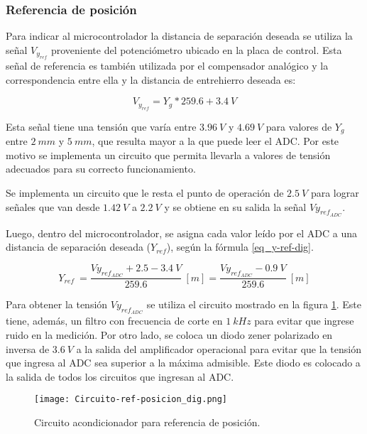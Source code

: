 \subsubsection{Referencia de posición}

 Para indicar al microcontrolador la distancia de separación deseada se utiliza la señal  $V_{y_{ref}}$ proveniente del potenciómetro ubicado en la placa de control. Esta señal de referencia es también utilizada por el compensador analógico y la correspondencia entre ella y la distancia de entrehierro deseada es:
 
 \begin{equation} \label{eq_vyref_vs_yg}
 	V_{y_{ref}}=Y_g*259.6+3.4\:V
 \end{equation}
 
Esta señal tiene una tensión que varía entre $3.96\:V$ y $4.69\:V$ para valores de $Y_g$ entre $2\:mm$ y $5\:mm$, que resulta mayor a la que puede leer el ADC. Por este motivo se implementa un circuito que permita llevarla a valores de tensión adecuados para su correcto funcionamiento. 

Se implementa un circuito que le resta el punto de operación de $2.5\:V$  para lograr señales que van desde $1.42\:V$ a $2.2\:V$ y se obtiene en su salida la señal $Vy_{ref_{ADC}}$.

Luego, dentro del microcontrolador, se asigna cada valor leído por el ADC a una distancia de separación deseada ($Y_{ref}$), según la fórmula \ref{eq_y-ref-dig}.

\begin{equation} \label{eq_y-ref-dig}
	Y_{ref}\ =\frac{Vy_{ref_{ADC}} +2.5 - 3.4\:V}{259.6}\:[m]=\frac{Vy_{ref_{ADC}} - 0.9\:V}{259.6}\:[m]
\end{equation}

Para obtener la tensión $Vy_{ref_{ADC}}$ se utiliza el circuito mostrado en la figura \ref{fig:circuito-ref-posicion}. Este tiene, además, un filtro con frecuencia de corte en $1\:kHz$ para evitar que ingrese ruido en la medición. Por otro lado, se coloca un diodo zener polarizado en inversa de $3.6\:V$ a la salida del amplificador operacional para evitar que la tensión que ingresa al ADC sea superior a la máxima admisible. Este diodo es colocado a la salida de todos los circuitos que ingresan al ADC.


\begin{figure}[H]
	\centering
	\texttt{[image: Circuito-ref-posicion\_dig.png]}
	\caption{Circuito acondicionador para referencia de posición.}
	\label{fig:circuito-ref-posicion}
\end{figure}


